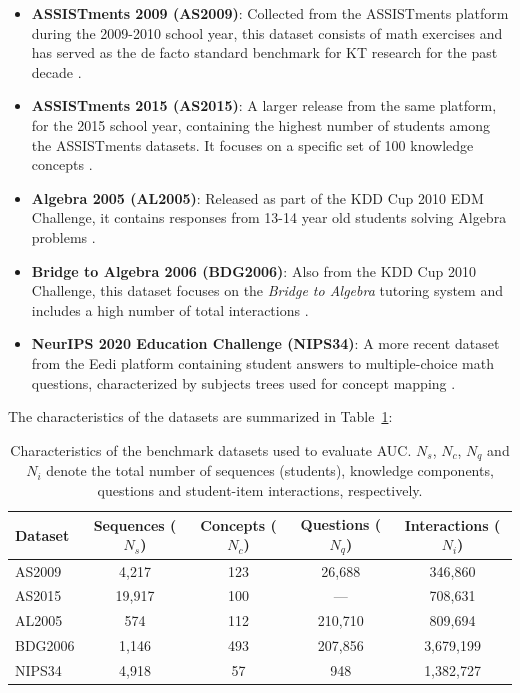 \documentclass[applsci,article,submit,moreauthors,pdftex]{Definitions/mdpi}
\begin{document}
\begin{itemize}
    \item \textbf{ASSISTments 2009 (AS2009)}: Collected from the ASSISTments platform during the 2009-2010 school year, this dataset consists of math exercises and has served as the de facto standard benchmark for KT research for the past decade \citep{feng2009addressing}.
    \item \textbf{ASSISTments 2015 (AS2015)}: A larger release from the same platform, for the 2015 school year, containing the highest number of students among the ASSISTments datasets. It focuses on a specific set of 100 knowledge concepts \citep{feng2009addressing}.
    \item \textbf{Algebra 2005 (AL2005)}: Released as part of the KDD Cup 2010 EDM Challenge, it contains responses from 13-14 year old students solving Algebra problems \citep{stamper2010algebra}.
    \item \textbf{Bridge to Algebra 2006 (BDG2006)}: Also from the KDD Cup 2010 Challenge, this dataset focuses on the \textit{Bridge to Algebra} tutoring system and includes a high number of total interactions \citep{stamper2010algebra}.
    \item \textbf{NeurIPS 2020 Education Challenge (NIPS34)}: A more recent dataset from the Eedi platform containing student answers to multiple-choice math questions, characterized by subjects trees used for concept mapping \citep{wang2020instructions}.
\end{itemize}

The characteristics of the datasets are summarized in Table~\ref{tab_datasets}: 

\begin{table}[htbp]
\centering
\begin{tabularx}{\textwidth}{lcccc}
\toprule
\textbf{Dataset} & \textbf{Sequences ($N_s$)} & \textbf{Concepts ($N_c$)} & \textbf{Questions ($N_q$)} & \textbf{Interactions ($N_i$)} \\
\midrule
AS2009 & 4,217 & 123 & 26,688 & 346,860 \\
AS2015 & 19,917 & 100 & --- & 708,631 \\
AL2005 & 574 & 112 & 210,710 & 809,694 \\
BDG2006 & 1,146 & 493 & 207,856 & 3,679,199 \\
NIPS34 & 4,918 & 57 & 948 & 1,382,727 \\
\bottomrule
\end{tabularx}
\caption{Characteristics of the benchmark datasets used to evaluate AUC. $N_s$, $N_c$, $N_q$ and $N_i$ denote the total number of sequences (students), knowledge components, questions and student-item interactions, respectively. \label{tab_datasets}}
\end{table}
\end{document}
